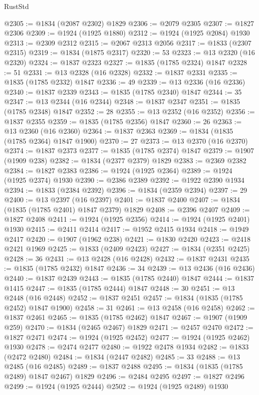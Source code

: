 \begin{lexlean}{RustStd}
\begin{coremodule}
{\begin{coremodule}
{{{{{@2305 := @1834 (@2087 @2302) @1829
@2306 := @2079 @2305
@2307 := @1827 @2306
@2309 := @1924 (@1925 @1880)
@2312 := @1924 (@1925 @2084) @1930
@2313 := @2309 @2312
@2315 := @2067 @2313 @2056
@2317 := @1833 (@2307 @2315)
@2319 := @1834 (@1875 @2317)
@2320 := 53
@2323 := @13 @2320 (@16 @2320)
@2324 := @1837 @2323
@2327 := @1835 (@1785 @2324) @1847
@2328 := 51
@2331 := @13 @2328 (@16 @2328)
@2332 := @1837 @2331
@2335 := @1835 (@1785 @2332) @1847
@2336 := 49
@2339 := @13 @2336 (@16 @2336)
@2340 := @1837 @2339
@2343 := @1835 (@1785 @2340) @1847
@2344 := 35
@2347 := @13 @2344 (@16 @2344)
@2348 := @1837 @2347
@2351 := @1835 (@1785 @2348) @1847
@2352 := 28
@2355 := @13 @2352 (@16 @2352)
@2356 := @1837 @2355
@2359 := @1835 (@1785 @2356) @1847
@2360 := 26
@2363 := @13 @2360 (@16 @2360)
@2364 := @1837 @2363
@2369 := @1834 (@1835 (@1785 @2364) @1847 @1900)
@2370 := 27
@2373 := @13 @2370 (@16 @2370)
@2374 := @1837 @2373
@2377 := @1835 (@1785 @2374) @1847
@2379 := @1907 (@1909 @238)
@2382 := @1834 (@2377 @2379) @1829
@2383 := @2369 @2382
@2384 := @1827 @2383
@2386 := @1924 (@1925 @2364)
@2389 := @1924 (@1925 @2374) @1930
@2390 := @2386 @2389
@2392 := @1922 @2390 @1934
@2394 := @1833 (@2384 @2392)
@2396 := @1834 (@2359 @2394)
@2397 := 29
@2400 := @13 @2397 (@16 @2397)
@2401 := @1837 @2400
@2407 := @1834 (@1835 (@1785 @2401) @1847 @2379) @1829
@2408 := @2396 @2407
@2409 := @1827 @2408
@2411 := @1924 (@1925 @2356)
@2414 := @1924 (@1925 @2401) @1930
@2415 := @2411 @2414
@2417 := @1952 @2415 @1934
@2418 := @1949 @2417
@2420 := @1907 (@1962 @238)
@2421 := @1830 @2420
@2423 := @2418 @2421 @1969
@2425 := @1833 (@2409 @2423)
@2427 := @1834 (@2351 @2425)
@2428 := 36
@2431 := @13 @2428 (@16 @2428)
@2432 := @1837 @2431
@2435 := @1835 (@1785 @2432) @1847
@2436 := 34
@2439 := @13 @2436 (@16 @2436)
@2440 := @1837 @2439
@2443 := @1835 (@1785 @2440) @1847
@2444 := @1837 @1415
@2447 := @1835 (@1785 @2444) @1847
@2448 := 30
@2451 := @13 @2448 (@16 @2448)
@2452 := @1837 @2451
@2457 := @1834 (@1835 (@1785 @2452) @1847 @1900)
@2458 := 31
@2461 := @13 @2458 (@16 @2458)
@2462 := @1837 @2461
@2465 := @1835 (@1785 @2462) @1847
@2467 := @1907 (@1909 @259)
@2470 := @1834 (@2465 @2467) @1829
@2471 := @2457 @2470
@2472 := @1827 @2471
@2474 := @1924 (@1925 @2452)
@2477 := @1924 (@1925 @2462) @1930
@2478 := @2474 @2477
@2480 := @1922 @2478 @1934
@2482 := @1833 (@2472 @2480)
@2484 := @1834 (@2447 @2482)
@2485 := 33
@2488 := @13 @2485 (@16 @2485)
@2489 := @1837 @2488
@2495 := @1834 (@1835 (@1785 @2489) @1847 @2467) @1829
@2496 := @2484 @2495
@2497 := @1827 @2496
@2499 := @1924 (@1925 @2444)
@2502 := @1924 (@1925 @2489) @1930
}}}}}
\end{coremodule}}
\end{coremodule}
\end{lexlean}
